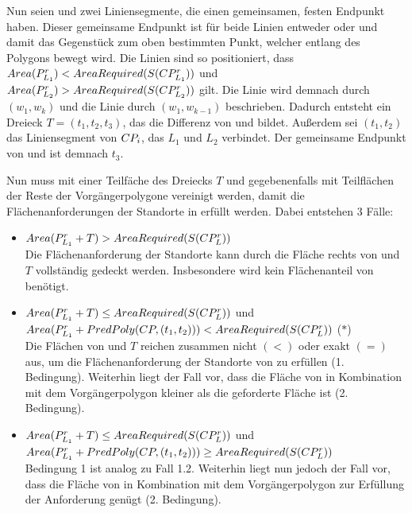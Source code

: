 \documentclass[ngerman]{seminarbeitrag}
\begin{document}
Nun seien \leins und \lzwei zwei Liniensegmente, die einen gemeinsamen, festen Endpunkt haben. Dieser gemeinsame Endpunkt ist für beide Linien entweder \ls oder \Le und damit das Gegenstück zum oben bestimmten Punkt, welcher entlang des Polygons bewegt wird. Die Linien sind so positioniert, dass $Area(P^{r}_{L_{1}}) < AreaRequired(S(CP^{r}_{L_{1}}))$ und $Area(P^{r}_{L_{2}}) > AreaRequired(S(CP^{r}_{L_{2}}))$ gilt. Die Linie \lzwei wird demnach durch $(w_{1}, w_{k})$ und die Linie \leins durch $(w_{1}, w_{k-1})$ beschrieben.
Dadurch entsteht ein Dreieck $T = (t_{1}, t_{2}, t_{3})$, das die Differenz von \cprleins und \cprlzwei bildet. Außerdem sei $(t_{1}, t_{2})$ das Liniensegment von $CP_{i}$, das $L_{1}$ und $L_{2}$ verbindet. Der gemeinsame Endpunkt von \leins und \lzwei ist demnach $t_{3}$.

Nun muss \cprleins mit einer Teilfäche des Dreiecks $T$ und gegebenenfalls mit Teilflächen der Reste der Vorgängerpolygone vereinigt werden, damit die Flächenanforderungen der Standorte in \cprleins erfüllt werden. Dabei entstehen 3 Fälle:

\begin{itemize}
\item $Area(P_{L_{1}}^{r} + T) > AreaRequired(S(CP_{L}^{r}))$ \\
Die Flächenanforderung der Standorte kann durch die Fläche rechts von \leins und $T$ vollständig gedeckt werden. Insbesondere wird kein Flächenanteil von benötigt. 
\item $Area(P_{L_{1}}^{r} +T) \le AreaRequired(S(CP_{L}^{r}))$ und \\ $Area(P_{L_{1}}^{r}+PredPoly(CP,(t_{1},t_{2})))<AreaRequired(S(CP_{L}^{r}))$ \hfill ($\ast$) \\
Die Flächen von \prleins und $T$ reichen zusammen nicht $(<)$ oder exakt $(=)$ aus, um die Flächenanforderung der Standorte von \cprl zu erfüllen (1. Bedingung). Weiterhin liegt der Fall vor, dass die Fläche von \prleins in Kombination mit dem Vorgängerpolygon  kleiner als die geforderte Fläche ist (2. Bedingung).
\item $Area(P_{L_{1}}^{r} +T) \le AreaRequired(S(CP_{L}^{r}))$ und \\ $Area(P_{L_{1}}^{r}+PredPoly(CP,(t_{1},t_{2})))\ge AreaRequired(S(CP_{L}^{r}))$ \\
Bedingung 1 ist analog zu Fall 1.2. Weiterhin liegt nun jedoch der Fall vor, dass die Fläche von \prleins in Kombination mit dem Vorgängerpolygon zur Erfüllung der Anforderung genügt (2. Bedingung).
\end{itemize}
\end{document}
